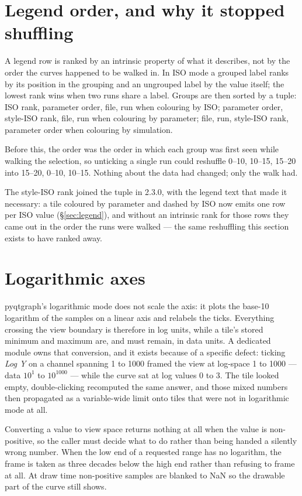 \documentclass[11pt,a4paper,oneside]{report}
\newcommand{\appver}{2.3.0}
\begin{document}
\section{Legend order, and why it stopped shuffling}

A legend row is ranked by an intrinsic property of what it describes, not by the
order the curves happened to be walked in. In ISO mode a grouped label ranks by
its position in the grouping and an ungrouped label by the value itself; the
lowest rank wins when two runs share a label. Groups are then sorted by a tuple:
ISO rank, parameter order, file, run when colouring by ISO; parameter order,
style-ISO rank, file, run when colouring by parameter; file, run, style-ISO
rank, parameter order when colouring by simulation.

Before this, the order was the order in which each group was first seen while
walking the selection, so unticking a single run could reshuffle 0--10, 10--15,
15--20 into 15--20, 0--10, 10--15. Nothing about the data had changed; only the
walk had.

The style-ISO rank joined the tuple in \appver, with the legend text that made
it necessary: a tile coloured by parameter and dashed by ISO now emits one row
per ISO value (\S\ref{sec:legend}), and without an intrinsic rank for those rows
they came out in the order the runs were walked --- the same reshuffling this
section exists to have ranked away.

\section{Logarithmic axes}

pyqtgraph's logarithmic mode does not scale the axis: it plots the base-10
logarithm of the samples on a linear axis and relabels the ticks. Everything
crossing the view boundary is therefore in log units, while a tile's stored
minimum and maximum are, and must remain, in data units. A dedicated module owns
that conversion, and it exists because of a specific defect: ticking \emph{Log
Y} on a channel spanning 1 to 1000 framed the view at log-space 1 to 1000 ---
data $10^1$ to $10^{1000}$ --- while the curve sat at log values 0 to 3. The
tile looked empty, double-clicking recomputed the same answer, and those mixed
numbers then propagated as a variable-wide limit onto tiles that were not in
logarithmic mode at all.

Converting a value to view space returns nothing at all when the value is
non-positive, so the caller must decide what to do rather than being handed a
silently wrong number. When the low end of a requested range has no logarithm,
the frame is taken as three decades below the high end rather than refusing to
frame at all. At draw time non-positive samples are blanked to NaN so the
drawable part of the curve still shows.
\end{document}
